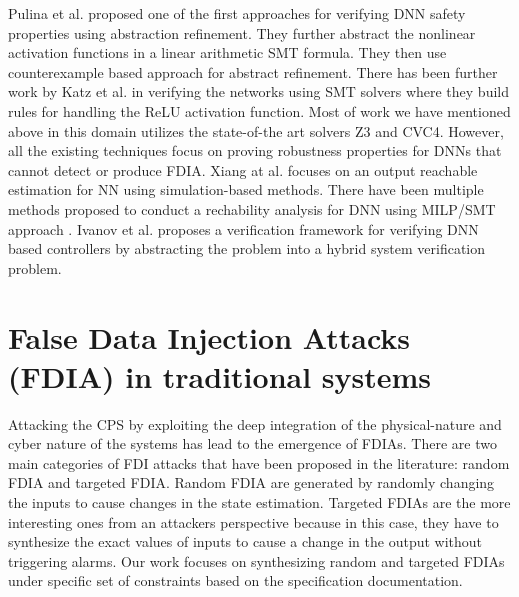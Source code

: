 Pulina et al.\cite{10.1007/978-3-642-14295-6_24} proposed one of the first approaches for verifying DNN safety properties using abstraction refinement. They further abstract \cite{article} the nonlinear activation functions in a linear arithmetic SMT formula. They then use counterexample based approach for abstract refinement. There has been further work by Katz et al.\cite{10.1007/978-3-319-63387-9_5} in verifying the networks using SMT solvers where they build rules for handling the ReLU activation function. Most of work we have mentioned above in this domain utilizes the state-of-the art solvers Z3 and CVC4. However, all the existing techniques focus on proving robustness properties \cite{NIPS2016_6339} for DNNs that cannot detect or produce FDIA. Xiang at al.\cite{xiang2017output} focuses on an output reachable estimation for NN using simulation-based methods. There have been multiple methods proposed to conduct a rechability analysis for DNN using MILP/SMT approach \cite{10.1145/3302504.3313351} \cite{ehlers2017formal} \cite{10.1007/978-3-319-63387-9_5} \cite{lomuscio2017approach} \cite{article}. Ivanov et al. \cite{ivanov2018verisig} proposes a verification framework for verifying DNN based controllers by abstracting the problem into a hybrid system verification problem.  

\section{False Data Injection Attacks (FDIA) in traditional systems}
Attacking the CPS by exploiting the deep integration of the physical-nature and cyber nature of the systems has lead to the emergence of FDIAs. 
There are two main categories of FDI attacks that have been proposed in the literature: random FDIA and targeted FDIA. Random FDIA are generated by randomly changing the inputs to cause changes in the state estimation. Targeted FDIAs are the more interesting ones from an attackers perspective because in this case, they have to synthesize the exact values of inputs to cause a change in the output without triggering alarms. Our work focuses on synthesizing random and targeted FDIAs under specific set of constraints based on the specification documentation. 

